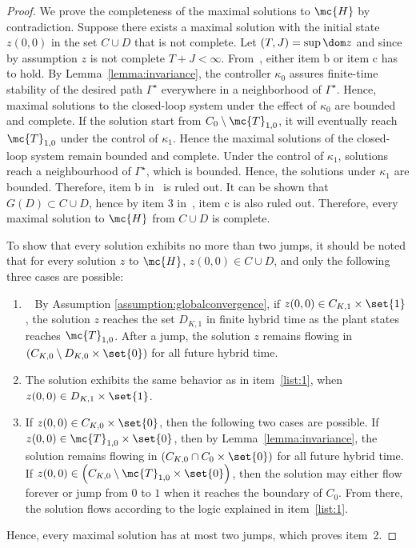{\begin{proof}
We prove the completeness of the maximal solutions to $\mc{H}$ by contradiction. Suppose there exists a maximal solution with the initial state $z(0,0)$ in the set $C\cup D$ that is not complete. Let $(T,J) = \sup \dom z$ and since by assumption $z$ is not complete $T + J < \infty$. From~\cite[Proposition 2.34]{San2021}, either item b or item c has to hold. {By Lemma~\ref{lemma:invariance}, the controller $\kappa_0$ assures finite-time stability of the desired path $\Gamma^\star$ everywhere in a neighborhood of $\Gamma^\star$. Hence, maximal solutions to the closed-loop system under the effect of $\kappa_0$ are bounded and complete. If the solution start from $C_0 \setminus \mc{T}_{1,0}$, it will eventually reach $\mc{T}_{1,0}$ under the control of $\kappa_1$. Hence the maximal solutions of the closed-loop system remain bounded and complete.} Under the control of $\kappa_1$, solutions reach a neighbourhood of $\Gamma^\star$, which is bounded. Hence, the solutions under $\kappa_1$ are bounded. Therefore, item b in~\cite[Proposition 2.34]{San2021} is ruled out. It can be shown that $G(D) \subset C \cup D$, hence by item 3 in~\cite[Proposition 2.34]{San2021}, item c is also ruled out. Therefore, every maximal solution to $\mc{H}$ from $C\cup D$ is complete. 

To show that every solution exhibits no more than two jumps, it should be noted that for every solution $z$ to $\mc{H}$, $z(0,0) \in C \cup D$, and only the following three cases are possible:

\begin{enumerate}
    \item~\label{list:1} By Assumption \ref{assumption:globalconvergence}, if $z(0,0) \in C_{K,1} \times \set{1}$, the solution $z$ reaches the set $D_{K,1}$ in finite hybrid time as the plant states reaches $\mc{T}_{1,0}$. After a jump, the solution $z$ remains flowing in $\left( C_{K,0}\setminus D_{K,0} \times \set{0}  \right)$ for all future hybrid time.
    \item The solution exhibits the same behavior as in item~\ref{list:1}, when $z(0,0)\in D_{K,1} \times \set{1}$.
    \item If $z(0,0) \in C_{K,0} \times \set{0}$, then the following two cases are possible. If $z(0,0) \in \mc{T}_{1,0} \times \set{0}$, then by Lemma~\ref{lemma:invariance}, the solution remains flowing in $\left(  C_{K,0} \cap {C}_0 \times \set{0}\right)$ for all future hybrid time. If $z(0,0) \in \left( C_{K,0} \setminus \mc{T}_{1,0} \times \set{0}  \right)$, then the solution may either flow forever or jump from $0$ to $1$ when it reaches the boundary of ${C}_0$. From there, the solution flows according to the logic explained in item~\ref{list:1}.
\end{enumerate}
Hence, every maximal solution has at most two jumps, which proves item~2.


\end{proof}}
